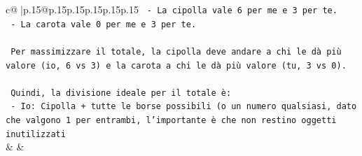 \documentclass{article}
\begin{document}
{\begin{supertabular}{c@{$\;$}|p{.15\linewidth}@{}p{.15\linewidth}p{.15\linewidth}p{.15\linewidth}p{.15\linewidth}p{.15\linewidth}}
{{{\texttt{    {-} La cipolla vale 6 per me e 3 per te.} \\
\texttt{    {-} La carota vale 0 per me e 3 per te.} \\
\\ 
\texttt{    Per massimizzare il totale, la cipolla deve andare a chi le dà più valore (io, 6 vs 3) e la carota a chi le dà più valore (tu, 3 vs 0).} \\
\\ 
\texttt{    Quindi, la divisione ideale per il totale è:} \\
\texttt{    {-} Io: Cipolla + tutte le borse possibili (o un numero qualsiasi, dato che valgono 1 per entrambi, l'importante è che non restino oggetti inutilizzati} \\
            }
        }
    }
    & & \\ \\


\end{supertabular}}
\end{document}
